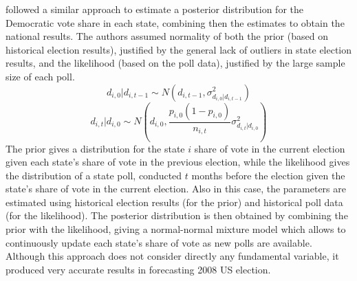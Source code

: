 \documentclass[
  12pt]{article}
\begin{document}
\citep{loc:gel:2010} followed a similar approach to estimate a posterior
distribution for the Democratic vote share in each state, combining then
the estimates to obtain the national results. The authors assumed
normality of both the prior (based on historical election results),
justified by the general lack of outliers in state election results, and
the likelihood (based on the poll data), justified by the large sample
size of each poll.
\[d_{i,0}|d_{i,t-1} \sim N(d_{i,t-1}, \sigma^2_{d_{i,0}|d_{i,t-1}})\]
\[d_{i,t}|d_{i,0} \sim N(d_{i,0}, \frac{p_{i,0}(1-p_{i,0})}{n_{i,t}} \sigma^2_{d_{i,t}|d_{i,0}})\]
The prior gives a distribution for the state \(i\) share of vote in the
current election given each state's share of vote in the previous
election, while the likelihood gives the distribution of a state poll,
conducted \(t\) months before the election given the state's share of
vote in the current election. Also in this case, the parameters are
estimated using historical election results (for the prior) and
historical poll data (for the likelihood). The posterior distribution is
then obtained by combining the prior with the likelihood, giving a
normal-normal mixture model which allows to continuously update each
state's share of vote as new polls are available. Although this approach
does not consider directly any fundamental variable, it produced very
accurate results in forecasting 2008 US election.
\end{document}
